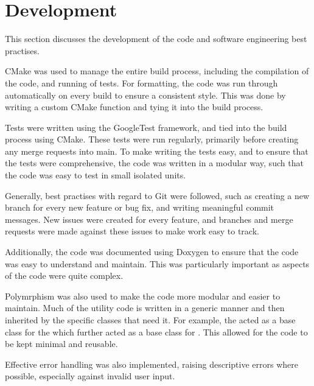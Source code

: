 
\section{Development}\label{sec:development}
    This section discusses the development of the code and software engineering best practises.

    CMake was used to manage the entire build process, including the compilation of the code, and running of tests.
    For formatting, the code was run through  automatically on every build to ensure a consistent
    style.
    This was done by writing a custom CMake function and tying it into the build process.

    Tests were written using the GoogleTest framework, and tied into the build process using CMake.
    These tests were run regularly, primarily before creating any merge requests into main.
    To make writing the tests easy, and to ensure that the tests were comprehensive, the code was written in a modular
    way, such that the code was easy to test in small isolated units.

    Generally, best practises with regard to Git were followed, such as creating a new branch for every new feature
    or bug fix, and writing meaningful commit messages.
    New issues were created for every feature, and branches and merge requests were made against these issues to make
    work easy to track.

    Additionally, the code was documented using Doxygen to ensure that the code was easy to understand and maintain.
    This was particularly important as aspects of the code were quite complex.

    Polymrphism was also used to make the code more modular and easier to maintain.
    Much of the utility code is written in a generic manner and then inherited by the specific classes that need it.
    For example, the  acted as a base class for the  which further
    acted as a base class for .
    This allowed for the code to be kept minimal and reusable.

    Effective error handling was also implemented, raising descriptive errors where possible, especially against
    invalid user input.

